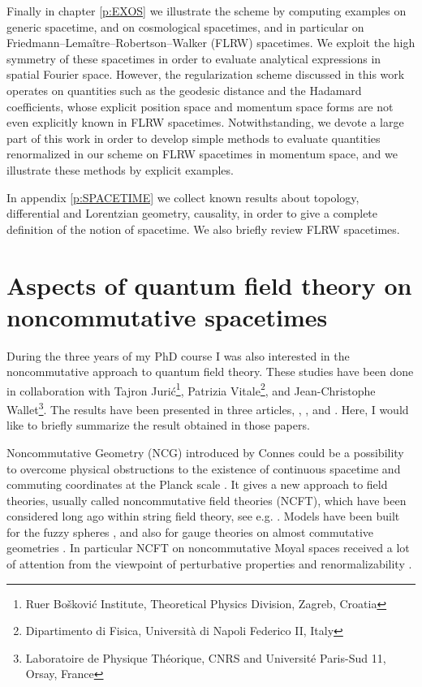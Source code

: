 \documentclass[11pt]{book}
\theoremstyle{break}
\begin{document}
Finally in chapter \ref{p:EXOS} we illustrate the scheme by computing examples on generic spacetime, and on cosmological spacetimes, and in particular on  Friedmann--Lemaître--Robertson--Walker (FLRW) spacetimes. We exploit the high symmetry of these spacetimes in order to evaluate analytical expressions in spatial Fourier space. However, the regularization scheme discussed in this work operates on quantities such as the geodesic distance and the Hadamard coefficients, whose explicit position space and momentum space forms are not even explicitly known in FLRW spacetimes. Notwithstanding, we devote a large part of this work in order to develop simple methods to evaluate quantities renormalized in our scheme on FLRW spacetimes in momentum space, and we illustrate these methods by explicit examples.


In appendix \ref{p:SPACETIME} we collect known results about topology, differential and Lorentzian geometry, causality, in order to give a complete definition of the notion of spacetime. We also briefly review FLRW spacetimes.


\section*{Aspects of quantum field theory on noncommutative spacetimes}


During the three years of my PhD course I was also interested in the noncommutative approach to quantum field theory. These studies have been done in collaboration with  Tajron Juri\'c\footnote{Ru\dj er Bo\v{s}kovi\'c Institute, Theoretical Physics Division, Zagreb, Croatia}, Patrizia Vitale\footnote{Dipartimento di Fisica, Universit\`a di Napoli Federico II, Italy}, and Jean-Christophe Wallet\footnote{Laboratoire de Physique Th\'eorique, CNRS and Universit\'e Paris-Sud 11, Orsay, France}. The results have been presented in three articles, \cite{GW_2015}, \cite{GJW_2015}, and \cite{GVW_2014}. Here, I would like to briefly summarize the result obtained in those papers.\par%


\bigskip


Noncommutative Geometry (NCG) introduced by Connes \cite{CONNES_1994} could be a possibility to overcome physical obstructions to the existence of continuous spacetime and commuting coordinates at the Planck scale \cite{DFR_1994}. It gives a new approach to field theories, usually called noncommutative field theories (NCFT), which have been considered long ago within string field theory, see e.g. \cite{WITTEN_1986}. Models have been built for the fuzzy spheres \cite{MADORE_1999}, and also for gauge theories on almost commutative geometries \cite{DV_1999}. In particular NCFT on noncommutative Moyal spaces received a lot of attention from the viewpoint of perturbative properties and renormalizability \cite{MVRS_2000}.\par%
\end{document}
